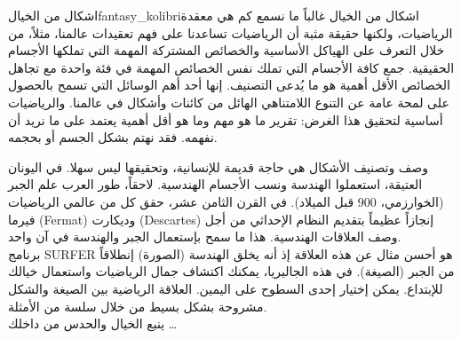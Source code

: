 \begin{surferIntroPage}{اشكال من الخيال}{fantasy_kolibri}{اشكال من الخيال}
غالباً ما نسمع كم هي معقدة الرياضيات، ولكنها حقيقة مثبة أن الرياضيات تساعدنا على فهم تعقيدات عالمنا، مثلاً، من خلال التعرف على الهياكل الأساسية والخصائص المشتركة المهمة التي تملكها الأجسام الحقيقية. جمع كافة الأجسام التي تملك نفس الخصائص المهمة في فئة واحدة مع تجاهل الخصائص الأقل أهمية هو ما يُدعى التصنيف. إنها أحد أهم الوسائل التي تسمح بالحصول على لمحة عامة عن التنوع اللامتناهي الهائل من كائنات وأشكال في عالمنا. والرياضيات أساسية لتحقيق هذا الغرض: تقرير ما هو مهم وما هو أقل أهمية يعتمد على ما نريد أن نفهمه. فقد نهتم بشكل الجسم أو بحجمه.
 \\

\vspace{0.4cm}

وصف وتصنيف الأشكال هي حاجة قديمة للإنسانية، وتحقيقها ليس سهلا. في اليونان العتيقة، استعملوا الهندسة ونسب الأجسام الهندسية. لاحقاً، طور العرب علم الجبر (الخوارزمي، 900 قبل الميلاد). في القرن الثامن عشر، حقق كل من عالمي الرياضيات فيرما
 \textenglish{(Fermat)}
  وديكارت
 \textenglish{(Descartes)}
    إنجازاً عظيماً بتقديم النظام الإحداثي من أجل وصف العلاقات الهندسية. هذا ما سمح بإستعمال الجبر والهندسة في آن واحد.
\\
\vspace{0.4cm}
برنامج SURFER هو أحسن مثال عن هذه العلاقة إذ أنه يخلق الهندسة (الصورة) إنطلاقاً من الجبر (الصيغة).
في هذه الجاليريا، يمكنك اكتشاف جمال الرياضيات واستعمال خيالك للإبتداع. يمكن إختيار إحدى السطوح على اليمين. العلاقة الرياضية بين الصيغة والشكل مشروحة بشكل بسيط من خلال سلسة من الأمثلة.\\
ينبع الخيال والحدس من داخلك \dots
\end{surferIntroPage}
